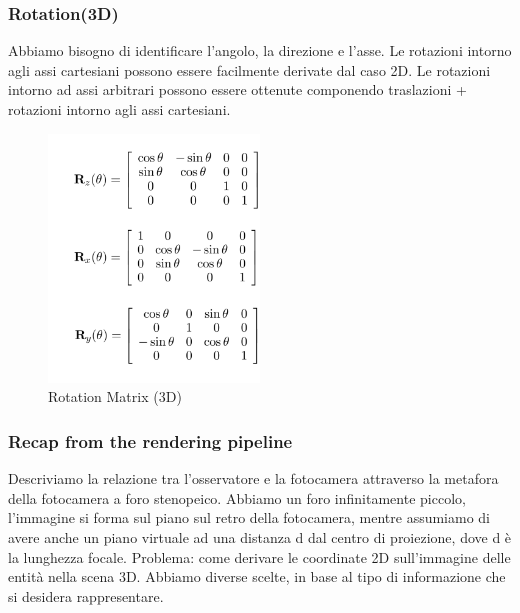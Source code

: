 \subsubsection{Rotation(3D)}
Abbiamo bisogno di identificare l'angolo, la direzione e l'asse. Le rotazioni intorno agli assi cartesiani possono essere facilmente derivate dal caso 2D. Le rotazioni intorno ad assi arbitrari possono essere ottenute componendo traslazioni + rotazioni intorno agli assi cartesiani.
\begin{figure}[H]
    \centering
    \includegraphics[width=0.5\textwidth]{images/Rot3D.png} 
    \caption{Rotation Matrix (3D)}
    \label{fig:immagine}
\end{figure}
\subsubsection{Recap from the rendering pipeline}
Descriviamo la relazione tra l'osservatore e la fotocamera attraverso la metafora della fotocamera a foro stenopeico. Abbiamo un foro infinitamente piccolo, l'immagine si forma sul piano sul retro della fotocamera, mentre assumiamo di avere anche un piano virtuale ad una distanza d dal centro di proiezione, dove d è la lunghezza focale.
Problema: come derivare le coordinate 2D sull'immagine delle entità nella scena 3D.
Abbiamo diverse scelte, in base al tipo di informazione che si desidera rappresentare.
